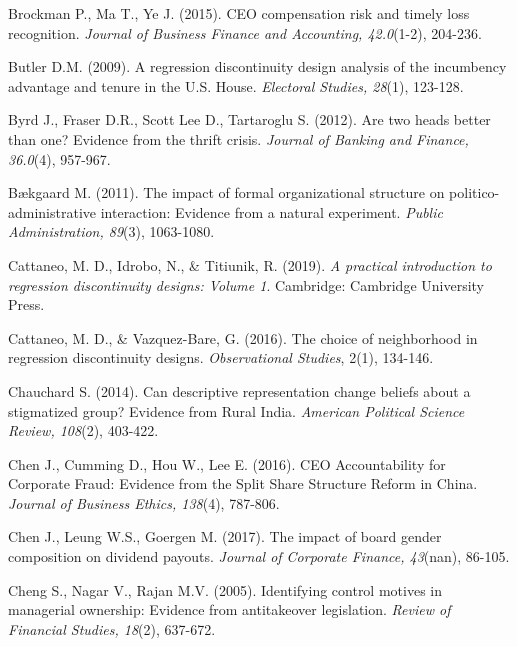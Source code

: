 \documentclass[english]{article}
\begin{document}
\begin{singlespace}
\begin{list}{}{\setlength\itemindent{-\leftmargin}}
\item *Brockman P., Ma T., Ye J. (2015). CEO compensation risk and timely loss recognition. \emph{Journal of Business Finance and Accounting, 42.0}(1-2), 204-236.

\item *Butler D.M. (2009). A regression discontinuity design analysis of the incumbency advantage and tenure in the U.S. House. \emph{Electoral Studies, 28}(1), 123-128.

\item *Byrd J., Fraser D.R., Scott Lee D., Tartaroglu S. (2012). Are two heads better than one? Evidence from the thrift crisis. \emph{Journal of Banking and Finance, 36.0}(4), 957-967.

\item *Bækgaard M. (2011). The impact of formal organizational structure on politico-administrative interaction: Evidence from a natural experiment.  \emph{Public Administration, 89}(3), 1063-1080.

\item Cattaneo, M. D., Idrobo, N., \& Titiunik, R. (2019). \emph{A practical introduction to regression discontinuity designs: Volume 1}. Cambridge: Cambridge University Press.

\item Cattaneo, M. D., \& Vazquez-Bare, G. (2016). The choice of neighborhood in regression discontinuity designs. \emph{Observational Studies}, 2(1), 134-146.

\item *Chauchard S. (2014). Can descriptive representation change beliefs about a stigmatized group? Evidence from Rural India. \emph{American Political Science Review, 108}(2), 403-422.

\item *Chen J., Cumming D., Hou W., Lee E. (2016). CEO Accountability for Corporate Fraud: Evidence from the Split Share Structure Reform in China. \emph{Journal of Business Ethics, 138}(4), 787-806.

\item *Chen J., Leung W.S., Goergen M. (2017). The impact of board gender composition on dividend payouts. \emph{Journal of Corporate Finance, 43}(nan), 86-105.

\item *Cheng S., Nagar V., Rajan M.V. (2005). Identifying control motives in managerial ownership: Evidence from antitakeover legislation.  \emph{Review of Financial Studies, 18}(2), 637-672.


\end{list}
\end{singlespace}
\end{document}
